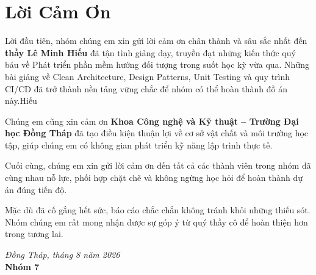 \chapter*{Lời Cảm Ơn}

Lời đầu tiên, nhóm chúng em xin gửi lời cảm ơn chân thành và sâu sắc nhất đến \textbf{thầy Lê Minh Hiếu} đã tận tình giảng dạy, truyền đạt những kiến thức quý báu về Phát triển phần mềm hướng đối tượng trong suốt học kỳ vừa qua. Những bài giảng về Clean Architecture, Design Patterns, Unit Testing và quy trình CI/CD đã trở thành nền tảng vững chắc để nhóm có thể hoàn thành đồ án này.Hiếu

Chúng em cũng xin cảm ơn \textbf{Khoa Công nghệ và Kỹ thuật -- Trường Đại học Đồng Tháp} đã tạo điều kiện thuận lợi về cơ sở vật chất và môi trường học tập, giúp chúng em có không gian phát triển kỹ năng lập trình thực tế.

Cuối cùng, chúng em xin gửi lời cảm ơn đến tất cả các thành viên trong nhóm đã cùng nhau nỗ lực, phối hợp chặt chẽ và không ngừng học hỏi để hoàn thành dự án đúng tiến độ.

Mặc dù đã cố gắng hết sức, báo cáo chắc chắn không tránh khỏi những thiếu sót. Nhóm chúng em rất mong nhận được sự góp ý từ quý thầy cô để hoàn thiện hơn trong tương lai.

\begin{flushright}
\textit{Đồng Tháp, tháng 8 năm 2026}\\
\textbf{Nhóm 7}
\end{flushright}
